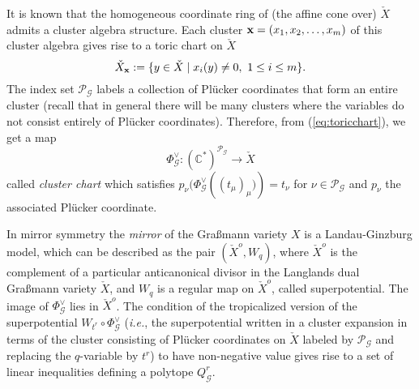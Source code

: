 \documentclass{emsprocart}
\theoremstyle{definition}
\begin{document}
It is known \cite{Sc} that the homogeneous coordinate ring of (the affine cone over) $\check{X}$ admits a cluster algebra structure. 
Each cluster ${\bf x}=(x_1,x_2,\ldots,x_m)$ of this cluster algebra gives rise to a toric chart on $\check{X}$
\begin{equation}\label{eq:toricchart}
\check{X}_{\bf x}\index{$\check{X}_{\bf x}$, toric chart associated to a cluster $\bold{x}$}:=\{y\in \check{X} \mid x_i(y)\ne 0, \ 1 \le i \le m\}.
\end{equation}%
The index set $\mathcal{P}_{\mathcal{G}}$ labels a collection of Pl\"ucker coordinates that form an entire cluster (recall that in general there will be many clusters 
where the variables do not consist entirely of Pl\"ucker coordinates). Therefore, from (\ref{eq:toricchart}), we get a map
\begin{equation}\label{eq:xtransformation}
{\Phi_{\mathcal G}^{\vee}}: \left(\mathbb{C}^*\right)^{\mathcal{P}_{\mathcal{G}}} \rightarrow \check{X}
\end{equation}
called {\it cluster chart} which satisfies $p_{\nu}(\Phi_{\mathcal G}^{\vee}\left((t_{\mu})_{\mu})\right)=t_{\nu}$ for 
$\nu\in \mathcal{P}_{\mathcal{G}}$ and $p_{\nu}$ the associated Pl\"ucker coordinate.

In mirror symmetry the {\it mirror} of the Gra\ss mann variety $X$ is a Landau-Ginzburg 
model, which can be described as the pair $(\check{X}^o,W_q)$, where $\check X^o$ 
is the complement of a particular anticanonical divisor in the Langlands dual Gra\ss mann variety $\check{X}$, 
and $W_q$ is a regular map on $\check{X}^o$, called superpotential. The image of $\Phi_{\mathcal G}^{\vee}$ lies in $\check{X}^o$. The condition of the tropicalized version of the superpotential $W_{t^r}\circ \Phi_{\mathcal G}^{\vee}$ (\emph{i.e.}, the superpotential written in a cluster expansion in terms of the cluster consisting of Pl\"ucker coordinates on $\check{X}$ labeled by $\mathcal{P}_{\mathcal{G}}$ and replacing the $q$-variable by $t^r$) to have non-negative value gives rise to a set of linear inequalities defining a polytope $Q_{\mathcal G}^r$.
\end{document}
